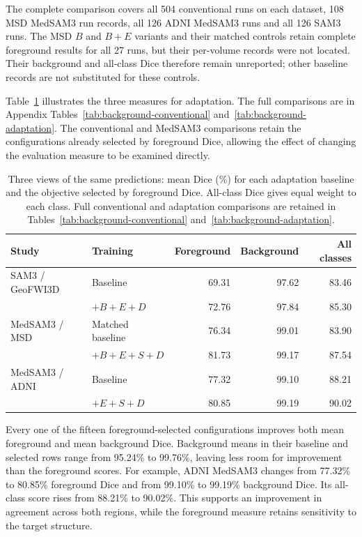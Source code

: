 \documentclass[12pt,a4paper]{article}
\begin{document}
The complete comparison covers all 504 conventional runs on each
dataset, 108 MSD MedSAM3 run records, all 126 ADNI MedSAM3 runs
and all 126 SAM3 runs.
The MSD $B$ and $B+E$ variants and their matched controls retain complete
foreground results for all 27 runs, but their per-volume records were
not located. Their background and all-class Dice therefore remain
unreported; other baseline records are not substituted for these controls.

Table~\ref{tab:dice-three-measures-summary} illustrates the three measures
for adaptation. The full comparisons are in Appendix Tables~\ref{tab:background-conventional}
and~\ref{tab:background-adaptation}. The conventional and MedSAM3 comparisons retain the
configurations already selected by foreground Dice, allowing the
effect of changing the evaluation measure to be examined directly.


\begin{table}[htbp]
\centering\small{}
\begin{tabular}{@{}llrrr@{}}
\hline
Study & Training & Foreground & Background & All classes \\
\hline
SAM3 / GeoFWI3D & Baseline & 69.31 & 97.62 & 83.46 \\
 & $+B+E+D$ & 72.76 & 97.84 & 85.30 \\
MedSAM3 / MSD & Matched baseline & 76.34 & 99.01 & 83.90 \\
 & $+B+E+S+D$ & 81.73 & 99.17 & 87.54 \\
MedSAM3 / ADNI & Baseline & 77.32 & 99.10 & 88.21 \\
 & $+E+S+D$ & 80.85 & 99.19 & 90.02 \\
\hline
\end{tabular}
\caption{Three views of the same predictions: mean Dice (\%) for each
adaptation baseline and the objective selected by foreground Dice.
All-class Dice gives equal weight to each class. Full conventional and
adaptation comparisons are retained in Tables~\ref{tab:background-conventional}
and~\ref{tab:background-adaptation}.}
\label{tab:dice-three-measures-summary}
\end{table}

Every one of the fifteen foreground-selected configurations improves both
mean foreground and mean background Dice. Background means in their
baseline and selected rows range from 95.24\% to 99.76\%, leaving
less room for improvement than the foreground scores. For example,
ADNI MedSAM3 changes from 77.32\% to 80.85\% foreground Dice and
from 99.10\% to 99.19\% background Dice. Its all-class score rises
from 88.21\% to 90.02\%. This supports an improvement in agreement
across both regions, while the foreground measure retains sensitivity
to the target structure.
\end{document}
